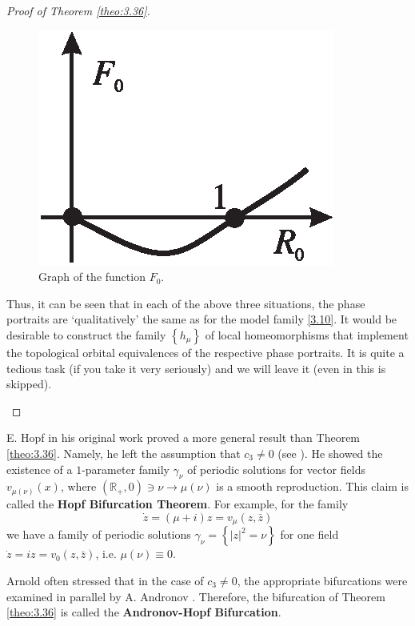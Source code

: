 \begin{proof}[Proof of Theorem \ref{theo:3.36}]
\begin{enumerate}[(a)]
		\begin{figure}[!ht]
			\centering
			\includegraphics [scale=1.4]{jtr315}
			\caption{Graph of the function $F_{0}$.}
			\label{fig:3.15}
		\end{figure}
		
		Thus, it can be seen that in each of the above three situations, the phase portraits are `qualitatively' the same as for the model family \eqref{3.10}. It would be desirable to construct the family $\left\{ h_{\mu}\right\} $ of local homeomorphisms that implement the topological orbital equivalences of the respective phase portraits. It is quite a tedious task (if you take it very seriously) and we will leave it (even in \cite{Ar2} this is skipped).
	\end{enumerate}
\end{proof}

\begin{remark}
	E. Hopf in his original work proved a more general result than Theorem \ref{theo:3.36}. Namely, he left the assumption that $c_3 \neq 0$ (see \cite{MaMc}). He showed the existence of a $1$-parameter family $\gamma _{\nu }$ of periodic solutions for vector fields $v_{\mu (\nu )}(x)$, where $\left( \mathbb{R}_{+},0\right) \ni \nu \longrightarrow \mu (\nu )$ is a smooth reproduction. This claim is called the \textbf{Hopf Bifurcation Theorem}. For example, for the family
	$$
	\dot{z}=\left( \mu +i\right) z=v_{\mu }(z,\bar{z})
	$$
	we have a family of periodic solutions $\gamma _{\nu }=\left\{
	\left\vert z\right\vert ^{2}=\nu \right\} $ for one field $\dot{z}%
	=iz=v_{0}(z,\bar{z})$, i.e.  $\mu (\nu )\equiv 0$.
	
	Arnold \cite{Ar2} often stressed that in the case of $c_{3}\not=0$, the appropriate bifurcations were examined in parallel by A. Andronov \cite{ALG2}. Therefore, the bifurcation of Theorem \ref{theo:3.36} is called the \textbf{Andronov-Hopf Bifurcation}.
\end{remark}

